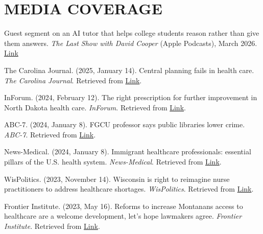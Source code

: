 \section*{MEDIA COVERAGE}
\begin{etaremune}
\item Guest segment on an AI tutor that helps college students reason rather than give them answers. \textit{The Last Show with David Cooper} (Apple Podcasts), March 2026. \hfill \href{https://podcasts.apple.com/ca/podcast/full-episode-bell-bottoms-may-never-die-march-23-2026/id1168275879?i=1000756951575}{Link}

\item The Carolina Journal. (2025, January 14). Central planning fails in health care. \textit{The Carolina Journal}. Retrieved from \hfill \href{https://www.carolinajournal.com/opinion/central-planning-fails-in-health-care/}{Link}.

\item InForum. (2024, February 12). The right prescription for further improvement in North Dakota health care. \textit{InForum}. Retrieved from \hfill \href{https://www.inforum.com/opinion/letters/letter-the-right-prescription-for-further-improvement-in-north-dakota-health-care}{Link}.

\item ABC-7. (2024, January 8). FGCU professor says public libraries lower crime. \textit{ABC-7}. Retrieved from \hfill \href{https://www.abc-7.com/article/fgcu-professor-says-public-libraries-lower-crime/46689106}{Link}.

\item News-Medical. (2024, January 8). Immigrant healthcare professionals: essential pillars of the U.S. health system. \textit{News-Medical}. Retrieved from \hfill \href{https://www.news-medical.net/news/20240108/Immigrant-healthcare-professionals-essential-pillars-of-the-US-health-system.aspx}{Link}.

\item WisPolitics. (2023, November 14). Wisconsin is right to reimagine nurse practitioners to address healthcare shortages. \textit{WisPolitics}. Retrieved from \hfill \href{https://www.wispolitics.com/2023/alicia-plemmons-wisconsin-is-right-to-reimagine-nurse-practitioners-to-address-healthcare-shortages/}{Link}.

\item Frontier Institute. (2023, May 16). Reforms to increase Montanans access to healthcare are a welcome development, let's hope lawmakers agree. \textit{Frontier Institute}. Retrieved from \hfill \href{https://frontierinstitute.org/the-reform-to-expand-access-to-healthcare-in-rural-montana/}{Link}.


\end{etaremune}
